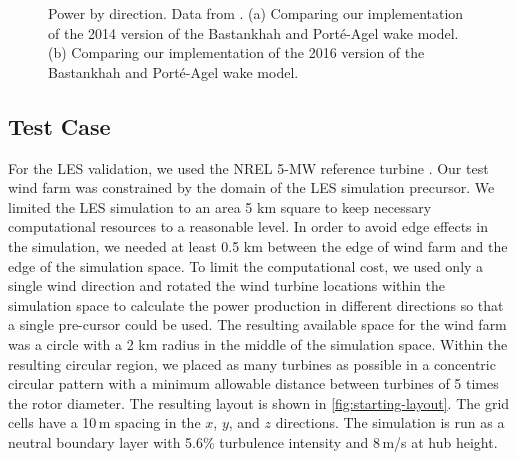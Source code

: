 \documentclass[conf]{new-aiaa}
\begin{document}
\begin{figure}[ht]
	\centering
	\caption{Power by direction. Data from \cite{niayifar2016}. (a) Comparing our implementation of the 2014 version of the Bastankhah and Port\'{e}-Agel wake model. (b) Comparing our implementation of the 2016 version of the Bastankhah and Port\'{e}-Agel wake model.}
	
	\label{fig:power_direction}
\end{figure}


\subsection{Test Case}

For the LES validation, we used the NREL 5-MW reference turbine \cite{jonkman2009}. Our test wind farm was constrained by the domain of the LES simulation precursor. We limited the LES simulation to an area 5 km square to keep necessary computational resources to a reasonable level. In order to avoid edge effects in the simulation, we needed at least 0.5 km between the edge of wind farm and the edge of the simulation space. To limit the computational cost, we used only a single wind direction and rotated the wind turbine locations within the simulation space to calculate the power production in different directions so that a single pre-cursor could be used. The resulting available space for the wind farm was a circle with a 2 km radius in the middle of the simulation space. Within the resulting circular region, we placed as many turbines as possible in a concentric circular pattern with a minimum allowable distance between turbines of 5 times the rotor diameter. The resulting layout is shown in \cref{fig:starting-layout}.  The grid cells have a 10\,m spacing in the $x$, $y$, and $z$ directions.  The simulation is run as a neutral boundary layer with 5.6\% turbulence intensity and 8\,m/s at hub height.  
\end{document}
